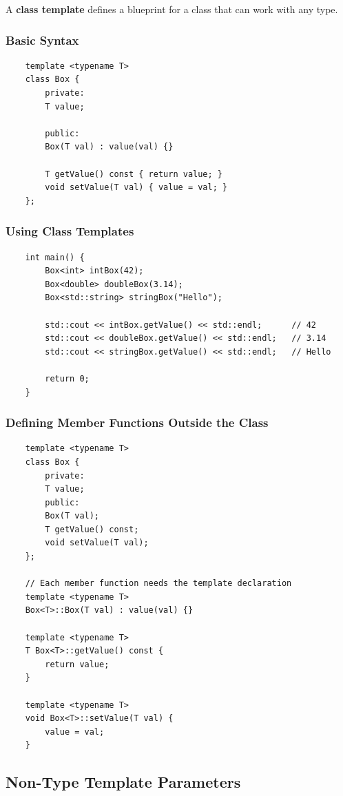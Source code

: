A \textbf{class template} defines a blueprint for a class that can work with any type.

\subsubsection{Basic Syntax}

\begin{lstlisting}
	template <typename T>
	class Box {
		private:
		T value;
		
		public:
		Box(T val) : value(val) {}
		
		T getValue() const { return value; }
		void setValue(T val) { value = val; }
	};
\end{lstlisting}

\subsubsection{Using Class Templates}

\begin{lstlisting}
	int main() {
		Box<int> intBox(42);
		Box<double> doubleBox(3.14);
		Box<std::string> stringBox("Hello");
		
		std::cout << intBox.getValue() << std::endl;      // 42
		std::cout << doubleBox.getValue() << std::endl;   // 3.14
		std::cout << stringBox.getValue() << std::endl;   // Hello
		
		return 0;
	}
\end{lstlisting}

\subsubsection{Defining Member Functions Outside the Class}

\begin{lstlisting}
	template <typename T>
	class Box {
		private:
		T value;
		public:
		Box(T val);
		T getValue() const;
		void setValue(T val);
	};
	
	// Each member function needs the template declaration
	template <typename T>
	Box<T>::Box(T val) : value(val) {}
	
	template <typename T>
	T Box<T>::getValue() const {
		return value;
	}
	
	template <typename T>
	void Box<T>::setValue(T val) {
		value = val;
	}
\end{lstlisting}

\subsection{Non-Type Template Parameters}

